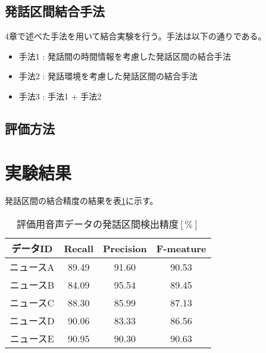 \subsection{発話区間結合手法}
4章で述べた手法を用いて結合実験を行う。手法は以下の通りである。

\begin{itemize}
\item 手法1 : 発話間の時間情報を考慮した発話区間の結合手法
\item 手法2 : 発話環境を考慮した発話区間の結合手法
\item 手法3 : 手法1 + 手法2
\end{itemize}\par\par

\subsection{評価方法}

\section{実験結果}
発話区間の結合精度の結果を表\ref{table:result_connect}に示す。

\begin{table}[htb]
  \begin{center}
    \caption{評価用音声データの発話区間検出精度$[\%]$}
    \begin{tabular}{|c||c|c|c|} \hline
      データID & Recall & Precision & F-meature \\ \hline
      ニュースA & 89.49 & 91.60 & 90.53 \\ \hline
      ニュースB & 84.09 & 95.54 & 89.45\\ \hline
      ニュースC & 88.30 & 85.99 & 87.13 \\ \hline
      ニュースD & 90.06 & 83.33 & 86.56\\ \hline
      ニュースE & 90.95 & 90.30 & 90.63\\ \hline
    \end{tabular}
  \end{center}
   \label{table:result_connect}
\end{table}